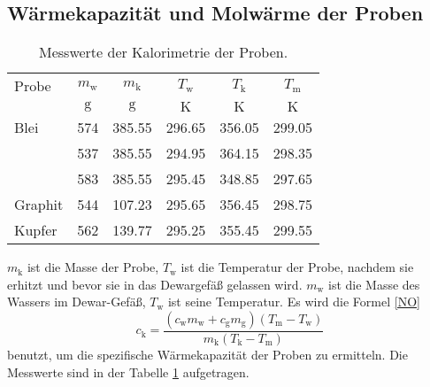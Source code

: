 \subsection{Wärmekapazität und Molwärme der Proben}
\begin{table}[htp]
	\centering
	\begin{tabular}{lccccc}
		\toprule
		{Probe}& {$m_\text{w}$} & {$m_\text{k}$} & {$T_\text{w}$} & {$T_\text{k}$} & {$T_\text{m}$}\\
		&{$\si{\gram}$}& {$\si{\gram}$}  &{$\si{\kelvin}$}& {$\si{\kelvin}$}  &{$\si{\kelvin}$}\\
		\midrule
		Blei		&574&	385.55	& 296.65 &	356.05&	299.05\\
					&537&	385.55	& 294.95 &	364.15&	298.35\\
					&583&	385.55	& 295.45 &	348.85&	297.65\\	
		Graphit		&544&	107.23	& 295.65 &	356.45&	298.75\\
		Kupfer		&562& 	139.77	& 295.25 &	355.45&	299.55\\
		\bottomrule
	\end{tabular}
	\caption{Messwerte der Kalorimetrie der Proben.}
	\label{tab:messung2}
\end{table}
$m_\text{k}$ ist die Masse der Probe, $T_\text{w}$ ist die Temperatur der Probe, nachdem sie erhitzt und bevor sie in das Dewargefäß gelassen wird.
$m_\text{w}$ ist die Masse des Wassers im Dewar-Gefäß, $T_\text{w}$ ist seine Temperatur.
Es wird die Formel \ref{NO}
\begin{equation}
	c_\mathup{k}=\frac{(c_\mathup{w}m_\mathup{w}+c_\mathup{g}m_\mathup{g})(T_\mathup{m}-T_\mathup{w})}{m_\mathup{k}(T_\mathup{k}-T_\mathup{m})}
\end{equation}
benutzt, um die spezifische Wärmekapazität der Proben zu ermitteln.
Die Messwerte sind in der Tabelle \ref{tab:messung2} aufgetragen.

